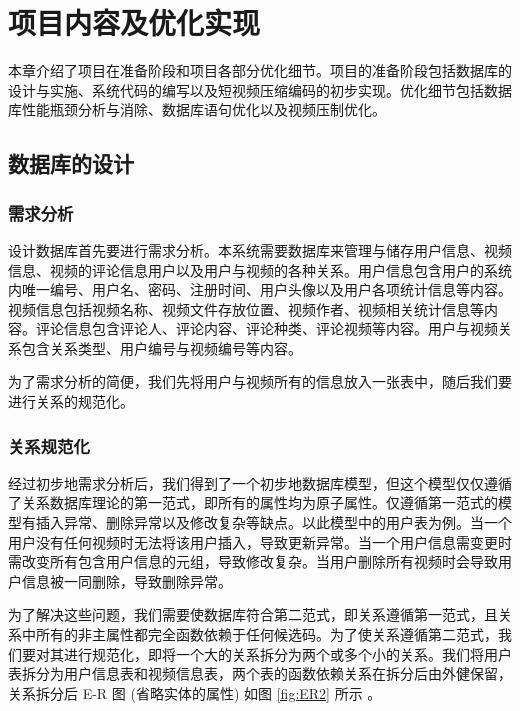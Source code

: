 \chapter{项目内容及优化实现}\label{sec:algorithm}

本章介绍了项目在准备阶段和项目各部分优化细节。项目的准备阶段包括数据库的设计与实施、系统代码的编写以及短视频压缩编码的初步实现。优化细节包括数据库性能瓶颈分析与消除、数据库语句优化以及视频压制优化。

\section{数据库的设计}
 
\subsection{需求分析}
设计数据库首先要进行需求分析\cite{gamma1995design}。本系统需要数据库来管理与储存用户信息、视频信息、视频的评论信息用户以及用户与视频的各种关系。用户信息包含用户的系统内唯一编号、用户名、密码、注册时间、用户头像以及用户各项统计信息等内容。视频信息包括视频名称、视频文件存放位置、视频作者、视频相关统计信息等内容。评论信息包含评论人、评论内容、评论种类、评论视频等内容。用户与视频关系包含关系类型、用户编号与视频编号等内容。

为了需求分析的简便，我们先将用户与视频所有的信息放入一张表中，随后我们要进行关系的规范化。

\subsection{关系规范化}

经过初步地需求分析后，我们得到了一个初步地数据库模型，但这个模型仅仅遵循了关系数据库理论的第一范式\cite{codd1972further}，即所有的属性均为原子属性。仅遵循第一范式的模型有插入异常、删除异常以及修改复杂等缺点。以此模型中的用户表为例。当一个用户没有任何视频时无法将该用户插入，导致更新异常。当一个用户信息需变更时需改变所有包含用户信息的元组，导致修改复杂。当用户删除所有视频时会导致用户信息被一同删除，导致删除异常。

为了解决这些问题，我们需要使数据库符合第二范式\cite{codd1972further}，即关系遵循第一范式，且关系中所有的非主属性都完全函数依赖于任何候选码。为了使关系遵循第二范式，我们要对其进行规范化，即将一个大的关系拆分为两个或多个小的关系。我们将用户表拆分为用户信息表和视频信息表，两个表的函数依赖关系在拆分后由外健保留，关系拆分后 E-R 图 (省略实体的属性) 如图 \ref{fig:ER2} 所示 。

